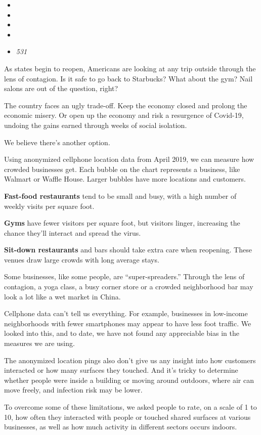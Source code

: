 \begin{itemize}
\item
\item
\item
\item
\item
  \emph{531}
\end{itemize}

As states begin to reopen, Americans are looking at any trip outside
through the lens of contagion. Is it safe to go back to Starbucks? What
about the gym? Nail salons are out of the question, right?

The country faces an ugly trade-off. Keep the economy closed and prolong
the economic misery. Or open up the economy and risk a resurgence of
Covid-19, undoing the gains earned through weeks of social isolation.

We believe there's another option.

Using anonymized cellphone location data from April 2019, we can measure
how crowded businesses get. Each bubble on the chart represents a
business, like Walmart or Waffle House. Larger bubbles have more
locations and customers.

\textbf{Fast-food restaurants} tend to be small and busy, with a high
number of weekly visits per square foot.

\textbf{Gyms} have fewer visitors per square foot, but visitors linger,
increasing the chance they'll interact and spread the virus.

\textbf{Sit-down restaurants} and bars should take extra care when
reopening. These venues draw large crowds with long average stays.

Some businesses, like some people, are ``super-spreaders.'' Through the
lens of contagion, a yoga class, a busy corner store or a crowded
neighborhood bar may look a lot like a wet market in China.

Cellphone data can't tell us everything. For example, businesses in
low-income neighborhoods with fewer smartphones may appear to have less
foot traffic. We looked into this, and to date, we have not found any
appreciable bias in the measures we are using.

The anonymized location pings also don't give us any insight into how
customers interacted or how many surfaces they touched. And it's tricky
to determine whether people were inside a building or moving around
outdoors, where air can move freely, and infection risk may be lower.

To overcome some of these limitations, we asked people to rate, on a
scale of 1 to 10, how often they interacted with people or touched
shared surfaces at various businesses, as well as how much activity in
different sectors occurs indoors.

